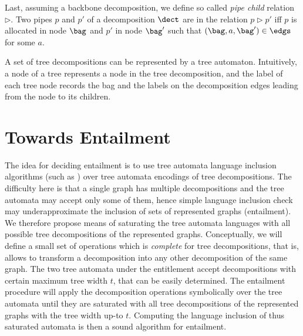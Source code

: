 {Last, assuming a backbone decomposition, we define so called \emph{pipe child} relation $\rhd$.
Two pipes $p$ and $p'$ of a decomposition $\dect$ are in the relation $p \rhd p'$ iff $p$ is allocated in node $\bag$ and $p'$ in node $\bag'$
such that $(\bag,a,\bag') \in \edgs$ for some $a$.

A set of tree decompositions can be represented by a tree automaton. 
Intuitively, a node of a tree represents a node in the tree decomposition, and the label of each tree node records the bag and the labels on the decomposition edges leading from the node to its children. %
%

\section{Towards Entailment}
The idea for deciding entailment is to use tree automata language inclusion algorithms (such as \cite{tacas10,almeida_reduction_2016,abdulla_computing_2008,libvata}) over tree automata encodings of tree decompositions.
The difficulty here is that a single graph has multiple decompositions and the tree automata may accept only some of them, hence simple language inclusion check may underapproximate the inclusion of sets of represented graphs (entailment).
%
We therefore propose means of saturating the tree automata languages with all possible tree decompositions of the represented graphs.
Conceptually, we will define a small set of operations which is \emph{complete} for tree decompositions, that is, allows to transform a decomposition into any other decomposition of the same graph.
%
The two tree automata under the entitlement accept decompositions with certain maximum tree width $t$, that can be easily determined.
%
The entailment procedure will apply the decomposition operations symbolically over the tree automata until they are saturated with all tree decompositions of the represented graphs with the tree width up-to $t$.
%
Computing the language inclusion of thus saturated automata is then a sound algorithm for entailment.



}
